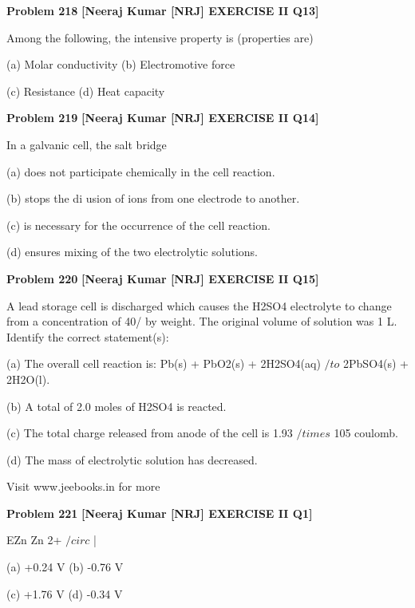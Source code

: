 \begin{problembox}
\textbf{Problem 218} \hfill \textbf{[Neeraj Kumar [NRJ] EXERCISE II Q13]}
\label{q:ext-nrj_all_questions-218}

Among the following, the intensive property is 
(properties are)
 
 (a) Molar conductivity 
(b) Electromotive force
 
 (c) Resistance 
(d) Heat capacity
\end{problembox}

\begin{problembox}
\textbf{Problem 219} \hfill \textbf{[Neeraj Kumar [NRJ] EXERCISE II Q14]}
\label{q:ext-nrj_all_questions-219}

In a galvanic cell, the salt bridge
 
 (a)  does not participate chemically in the cell 
reaction.
 
 (b)  stops the di  usion of ions from one electrode 
to another.
 
 (c)  is necessary for the occurrence of the cell 
reaction.
 
 (d)  ensures mixing of the two electrolytic 
solutions.
\end{problembox}

\begin{problembox}
\textbf{Problem 220} \hfill \textbf{[Neeraj Kumar [NRJ] EXERCISE II Q15]}
\label{q:ext-nrj_all_questions-220}

A lead storage cell is discharged which causes the 
H2SO4 electrolyte to change from a concentration 
of 40/%
by weight. The original volume of solution was 
1 L. Identify the correct statement(s):
 
 (a)  The overall cell reaction is: Pb(s) + PbO2(s) + 
2H2SO4(aq) $/to$ 2PbSO4(s) + 2H2O(l).
 
 (b)  A total of 2.0 moles of H2SO4 is reacted.
 
 (c)  The total charge released from anode of the 
cell is 1.93 $/times$ 105 coulomb.
 
 (d)  The mass of electrolytic solution has 
decreased.
 
 
Visit www.jeebooks.in for more
\end{problembox}

\begin{problembox}
\textbf{Problem 221} \hfill \textbf{[Neeraj Kumar [NRJ] EXERCISE II Q1]}
\label{q:ext-nrj_all_questions-221}

EZn
Zn
2+
$/circ$
|
 
 (a) +0.24 V 
(b) -0.76 V
 
 (c) +1.76 V 
(d) -0.34 V
\end{problembox}

